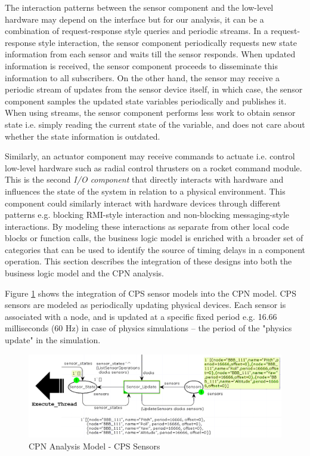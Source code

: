 The interaction patterns between the sensor component and the low-level hardware may depend on the interface but for our analysis, it can be a combination of request-response style queries and periodic streams. In a request-response style interaction, the sensor component periodically requests new state information from each sensor and waits till the sensor responds. When updated information is received, the sensor component proceeds to disseminate this information to all subscribers. On the other hand, the sensor may receive a periodic stream of updates from the sensor device itself, in which case, the sensor component samples the updated state variables periodically and publishes it. When using streams, the sensor component performs less work to obtain sensor state i.e. simply reading the current state of the variable, and does not care about whether the state information is outdated. 

Similarly, an actuator component may receive commands to actuate i.e. control low-level hardware such as radial control thrusters on a rocket command module. This is the second \emph{I/O component} that directly interacts with hardware and influences the state of the system in relation to a physical environment. This component could similarly interact with hardware devices through different patterns e.g. blocking RMI-style interaction and non-blocking messaging-style interactions. By modeling these interactions as separate from other local code blocks or function calls, the business logic model is enriched with a broader set of categories that can be used to identify the source of timing delays in a component operation. This section describes the integration of these designs into both the business logic model and the CPN analysis. 

Figure \ref{fig:sensors} shows the integration of CPS sensor models into the CPN model. CPS sensors are modeled as periodically updating physical devices. Each sensor is associated with a node, and is updated at a specific fixed period e.g. 16.66 milliseconds (60 Hz) in case of physics simulations -- the period of the "physics update" in the simulation. 

\begin{figure}[ht]
	\centering
	\includegraphics[width=\textwidth]{./img/sensors}
	\caption{CPN Analysis Model - CPS Sensors}
	\label{fig:sensors}
\end{figure}
\FloatBarrier

